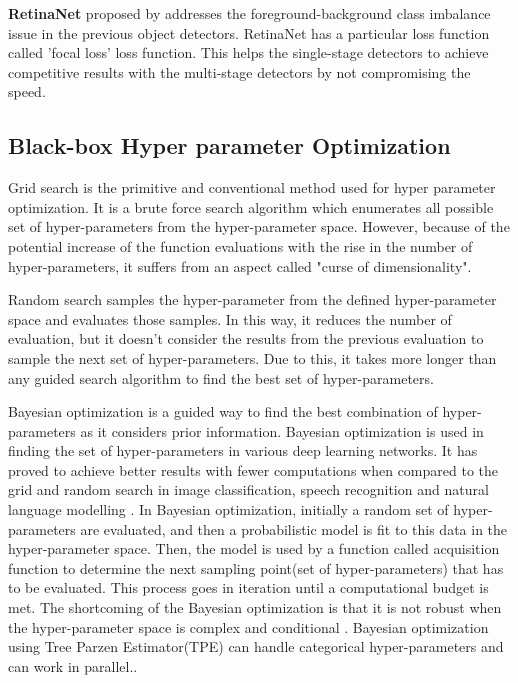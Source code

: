 \documentclass[thesis]{mas_proposal}
\begin{document}
\textbf{RetinaNet} proposed by \citet{lin2017focal} addresses the foreground-background class imbalance issue in the previous object detectors. RetinaNet has a particular loss function called 'focal loss' loss function. This helps the single-stage detectors to achieve competitive results with the multi-stage detectors by not compromising the speed.  

\subsection{Black-box Hyper parameter Optimization}

Grid search\cite{montgomery2001design} is the primitive and conventional method used for hyper parameter optimization. It is a brute force search algorithm which enumerates all possible set of hyper-parameters from the hyper-parameter space. However, because of the potential increase of the function evaluations with the rise in the number of hyper-parameters, it suffers from an aspect called "curse of dimensionality"\cite{friedman2018recursive}.

Random search\cite{bergstra2012random} samples the hyper-parameter from the defined hyper-parameter space and evaluates those samples. In this way, it reduces the number of evaluation, but it doesn't consider the results from the previous evaluation to sample the next set of hyper-parameters. Due to this, it takes more longer than any guided search algorithm to find the best set of hyper-parameters.  

Bayesian optimization\cite{movckus1975bayesian} is a guided way to find the best combination of hyper-parameters as it considers prior information. Bayesian optimization is used in finding the set of hyper-parameters in various deep learning networks. It has proved to achieve better results with fewer computations when compared to the grid and random search in image classification, speech recognition and natural language modelling \cite{snoek2012practical}\cite{snoek2015scalable}\cite{melis2017state}\cite{dahl2013improving}. In Bayesian optimization, initially a random set of hyper-parameters are evaluated, and then a probabilistic model is fit to this data in the hyper-parameter space. Then, the model is used by a function called acquisition function to determine the next sampling point(set of hyper-parameters) that has to be evaluated. This process goes in iteration until a computational budget is met. The shortcoming of the Bayesian optimization is that it is not robust when the hyper-parameter space is complex and conditional \cite{wang2013bayesian} \cite{swersky2014raiders}.
Bayesian optimization using Tree Parzen Estimator(TPE) can handle categorical hyper-parameters and can work in parallel.\cite{bergstra2011algorithms}.\cite{feurer_hyperparameter_2018}  
\end{document}
